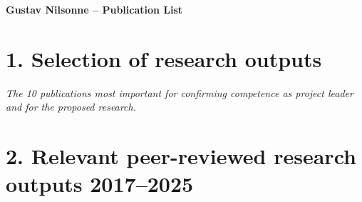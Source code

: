 \documentclass[11pt,a4paper]{article}
\begin{document}
\begin{center}
{\large\textbf{Gustav Nilsonne -- Publication List}}
\end{center}


\section*{1. Selection of research outputs}

{\small\textit{The 10 publications most important for confirming competence as project leader and for the proposed research.}}

\begin{enumerate}

\end{enumerate}


\section*{2. Relevant peer-reviewed research outputs 2017--2025}
\end{document}
